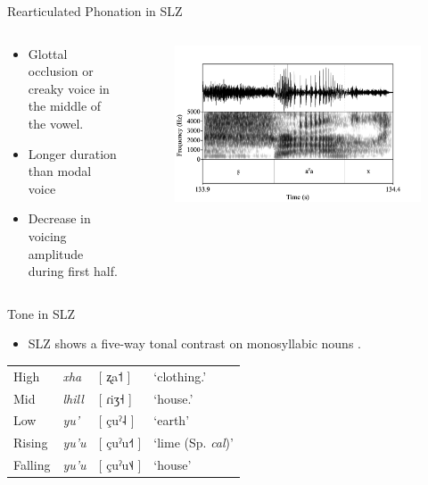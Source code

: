 \documentclass[professionalfont]{beamer}
\providecommand{\lsptoprule}{\midrule\toprule}
\providecommand{\lspbottomrule}{\bottomrule\midrule}
\begin{document}
\begin{frame}{Rearticulated Phonation in SLZ}
  \begin{columns}
    \begin{column}{0.33\linewidth}
      \begin{itemize}
        \item Glottal occlusion or creaky voice in the middle of the vowel.
        \item Longer duration than modal voice
        \item Decrease in voicing amplitude during first half.
      \end{itemize}  
    \end{column}

    \begin{column}{0.67\linewidth}
      \begin{figure}[h!]
        \centering
        \includegraphics[width=\textwidth]{images/Spectrograms/xa'ag.png}
      \end{figure}
    \end{column}
  \end{columns}
\end{frame}

\begin{frame}{Tone in SLZ}
  \begin{itemize}
    \item SLZ shows a five-way tonal contrast on monosyllabic nouns \citep{brinkerhoffTonalPatternsTheir2022}.
  \end{itemize}
  \begin{table}[!h]
	  \centering
	  \begin{tabular}{llll}
	    \lsptoprule
	    High   	 &  \textit{xha}   &  [ ʐa˦ ] & `clothing.\Poss{}'\\
	    Mid    	 &  \textit{lhill} 	& [ ɾiʒ˧ ] & `house.\Poss{}' \\
	    Low   	 &  \textit{yu'} 	& [ çuˀ˨ ] & `earth'\\
	    Rising	 &  \textit{yu'u} 	& [ çuˀu˧˦ ] & `lime (Sp. \textit{cal})' \\
	    Falling  &  \textit{yu'u}  &  [ çuˀu˦˨ ] &	`house' \\
	    \lspbottomrule
	  \end{tabular}
\end{table}
\end{frame}
\end{document}
